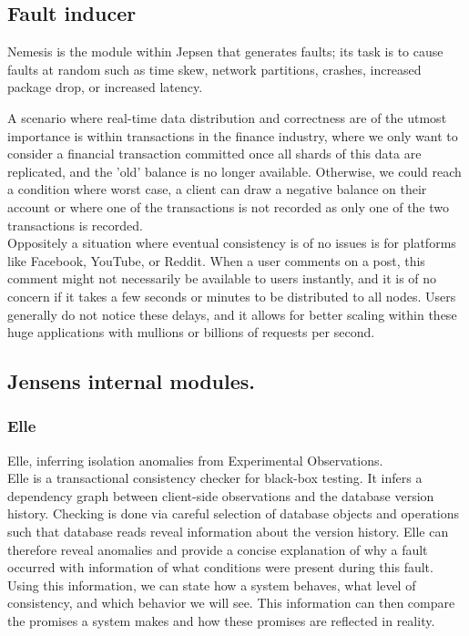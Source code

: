 \documentclass[a4paper,10pt,titlepage]{report}
\begin{document}
\subsection{Fault inducer}
Nemesis is the module within Jepsen that generates faults; its task is to cause faults at random such as time skew, network partitions, crashes, increased package drop, or increased latency.


A scenario where real-time data distribution and correctness are of the utmost importance is within transactions in the finance industry, where we only want to consider a financial transaction committed once all shards of this data are replicated, and the 'old' balance is no longer available. Otherwise, we could reach a condition where worst case, a client can draw a negative balance on their account or where one of the transactions is not recorded as only one of the two transactions is recorded.\\

Oppositely a situation where eventual consistency is of no issues is for platforms like Facebook, YouTube, or Reddit. When a user comments on a post, this comment might not necessarily be available to users instantly, and it is of no concern if it takes a few seconds or minutes to be distributed to all nodes. Users generally do not notice these delays, and it allows for better scaling within these huge applications with mullions or billions of requests per second.



\subsection{Jensens internal modules.}
\subsubsection{Elle}
Elle,\cite{elle} inferring isolation anomalies from Experimental Observations. \\

Elle is a transactional consistency checker for black-box testing. It infers a dependency graph between client-side observations and the database version history. Checking is done via careful selection of database objects and operations such that database reads reveal information about the version history. Elle can therefore reveal anomalies and provide a concise explanation of why a fault occurred with information of what conditions were present during this fault. Using this information, we can state how a system behaves, what level of consistency, and which behavior we will see. This information can then compare the promises a system makes and how these promises are reflected in reality.\\
\vspace{5mm}
\end{document}
